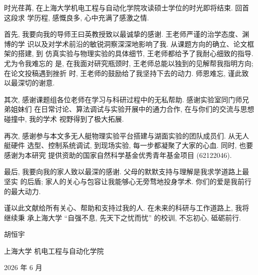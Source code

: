 \begin{acknowledgement}

时光荏苒, 在上海大学机电工程与自动化学院攻读硕士学位的时光即将结束. 回首这段求
学历程, 感慨良多, 心中充满了感激之情.

首先, 我要向我的导师王曰英教授致以最诚挚的感谢. 王老师严谨的治学态度、渊博的学
识以及对学术前沿的敏锐洞察深深地影响了我. 从课题方向的确立、论文框架的搭建, 到
仿真实验与物理实验的具体细节, 王老师都给予了我耐心细致的指导. 尤为令我难忘的
是, 在我面对研究瓶颈时, 王老师总能以独到的见解帮我指明方向; 在论文投稿遇到挫折
时, 王老师的鼓励给了我坚持下去的动力. 师恩难忘, 谨此致以最深切的谢意.

其次, 感谢课题组各位老师在学习与科研过程中的无私帮助. 感谢实验室同门师兄弟姐妹们
在日常讨论、算法调试与实验开展中的通力合作, 在与你们的交流与思想碰撞中, 我的学术
视野得到了极大拓展.

再次, 感谢参与本文多无人艇物理实验平台搭建与湖面实验的团队成员们. 从无人艇硬件
选型、控制系统调试, 到现场实验, 每一步都凝聚了大家的心血. 同时, 也要感谢为本研究
提供资助的国家自然科学基金优秀青年基金项目 (62122046).

最后, 我要向我的家人致以最深的感谢. 父母的默默支持与理解是我求学道路上最坚实
的后盾; 家人的关心与包容让我能够心无旁骛地投身学术. 你们的爱是我前行的最大动力.

谨以此文献给所有关心、帮助和支持过我的人. 在未来的科研与工作道路上, 我将继续秉
承上海大学 ``自强不息, 先天下之忧而忧'' 的校训, 不忘初心, 砥砺前行.

  \vspace{50bp}

  \hfill 胡恒宇

  \hfill 上海大学 机电工程与自动化学院

  \hfill 2026 年 6 月

\end{acknowledgement}
